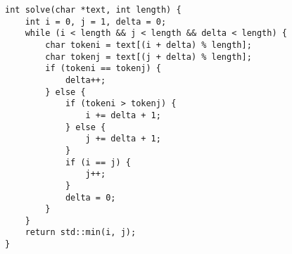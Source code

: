 \begin{lstlisting}
int solve(char *text, int length) {
    int i = 0, j = 1, delta = 0;
    while (i < length && j < length && delta < length) {
        char tokeni = text[(i + delta) % length];
        char tokenj = text[(j + delta) % length];
        if (tokeni == tokenj) {
            delta++;
        } else {
            if (tokeni > tokenj) {
                i += delta + 1;
            } else {
                j += delta + 1;
            }
            if (i == j) {
                j++;
            }
            delta = 0;
        }
    }
    return std::min(i, j);
}
\end{lstlisting}
